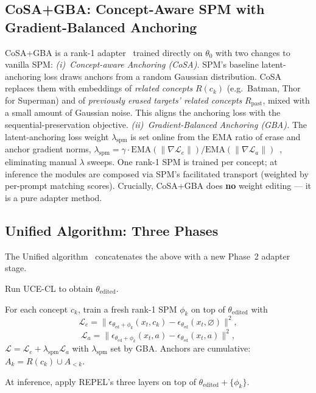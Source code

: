 \documentclass[10pt,twocolumn,letterpaper]{article}
\begin{document}
\subsection{CoSA+GBA: Concept-Aware SPM with Gradient-Balanced Anchoring}
\label{sec:cosa}
CoSA+GBA is a rank-1 adapter~\cite{lyu2024one} trained directly on
$\theta_0$ with two changes to vanilla SPM:
\emph{(i)~Concept-aware Anchoring (CoSA).} SPM's baseline latent-anchoring
loss draws anchors from a random Gaussian distribution. CoSA replaces them
with embeddings of \emph{related concepts} $R(c_k)$ (e.g.\ Batman, Thor
for Superman) and of \emph{previously erased targets' related concepts}
$R_\text{past}$, mixed with a small amount of Gaussian noise. This aligns
the anchoring loss with the sequential-preservation objective.
\emph{(ii)~Gradient-Balanced Anchoring (GBA).} The latent-anchoring loss
weight $\lambda_\text{spm}$ is set online from the EMA ratio of erase and
anchor gradient norms,
$\lambda_\text{spm} = \gamma \cdot
\mathrm{EMA}(\|\nabla \mathcal{L}_e\|) /
\mathrm{EMA}(\|\nabla \mathcal{L}_a\|)$~\cite{chen2018gradnorm},
eliminating manual $\lambda$ sweeps. One rank-1 SPM is trained per
concept; at inference the modules are composed via SPM's facilitated
transport (weighted by per-prompt matching scores). Crucially, CoSA+GBA
does \textbf{no} weight editing --- it is a pure adapter method.

\subsection{Unified Algorithm: Three Phases}
\label{sec:unified}
The Unified algorithm~\cite{assignment2024} concatenates the above with a
new Phase~2 adapter stage.
\begin{description}\itemsep1pt
\item[Phase 1.] Run UCE-CL to obtain $\theta_\text{edited}$.
\item[Phase 2.] For each concept $c_k$, train a fresh rank-1 SPM
$\phi_k$ on top of $\theta_\text{edited}$ with
\[\mathcal{L}_e\!=\!\|\epsilon_{\theta_\text{ed}+\phi_k}(x_t,c_k)-
\epsilon_{\theta_\text{ed}}(x_t,\varnothing)\|^2,\]
\[\mathcal{L}_a\!=\!\|\epsilon_{\theta_\text{ed}+\phi_k}(x_t,a)-
\epsilon_{\theta_\text{ed}}(x_t,a)\|^2,\]
$\mathcal{L}=\mathcal{L}_e + \lambda_\text{spm}\mathcal{L}_a$
with $\lambda_\text{spm}$ set by GBA. Anchors are cumulative:
$A_k = R(c_k) \cup A_{<k}$.
\item[Phase 3.] At inference, apply REPEL's three layers on top of
$\theta_\text{edited}\!+\!\{\phi_k\}$.
\end{description}
\end{document}
